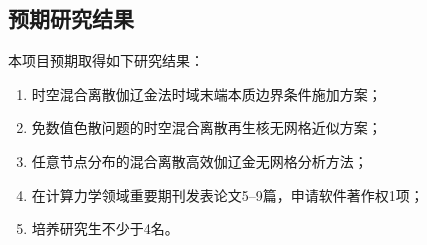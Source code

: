 \subsection{预期研究结果}
本项目预期取得如下研究结果：

\begin{enumerate}[label=（\theenumi）,left=24pt]
    \item 时空混合离散伽辽金法时域末端本质边界条件施加方案；
    \item 免数值色散问题的时空混合离散再生核无网格近似方案；
    \item 任意节点分布的混合离散高效伽辽金无网格分析方法；
    \item 在计算力学领域重要期刊发表论文5--9篇，申请软件著作权1项；
    \item 培养研究生不少于4名。
\end{enumerate}

\newpage